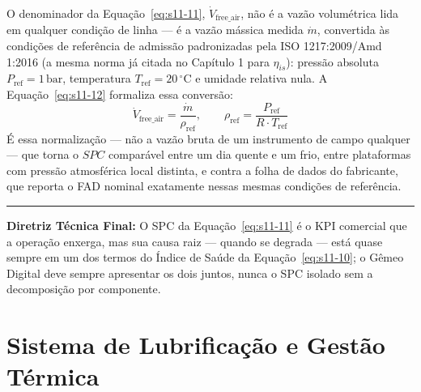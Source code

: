 \documentclass[12pt,a4paper]{article}
\numberwithin{equation}{section}
\numberwithin{table}{section}
\numberwithin{figure}{section}
\begin{document}
	O denominador da Equação~\eqref{eq:s11-11}, $\dot{V}_{\text{free\_air}}$, não é a vazão volumétrica lida em qualquer condição de linha — é a vazão mássica medida $\dot{m}$, convertida às condições de referência de admissão padronizadas pela ISO 1217:2009/Amd 1:2016 \cite{iso1217} (a mesma norma já citada no Capítulo 1 para $\eta_{is}$): pressão absoluta $P_{\text{ref}} = 1\,\text{bar}$, temperatura $T_{\text{ref}} = 20\,^{\circ}\text{C}$ e umidade relativa nula. A Equação~\eqref{eq:s11-12} formaliza essa conversão:
	\begin{equation}\label{eq:s11-12}
 \dot{V}_{\text{free\_air}} = \frac{\dot{m}}{\rho_{\text{ref}}}, \qquad \rho_{\text{ref}} = \frac{P_{\text{ref}}}{R \cdot T_{\text{ref}}}
\end{equation}
	É essa normalização — não a vazão bruta de um instrumento de campo qualquer — que torna o $SPC$ comparável entre um dia quente e um frio, entre plataformas com pressão atmosférica local distinta, e contra a folha de dados do fabricante, que reporta o FAD nominal exatamente nessas mesmas condições de referência.

	\vspace{1em}
	\hrule
	\vspace{1em}

	\textbf{Diretriz Técnica Final:} O SPC da Equação~\eqref{eq:s11-11} é o KPI comercial que a operação enxerga, mas sua causa raiz — quando se degrada — está quase sempre em um dos termos do Índice de Saúde da Equação~\eqref{eq:s11-10}; o Gêmeo Digital deve sempre apresentar os dois juntos, nunca o SPC isolado sem a decomposição por componente.

	
	
	\clearpage
	\section{\textbf{Sistema de Lubrificação e Gestão Térmica}}

\end{document}
